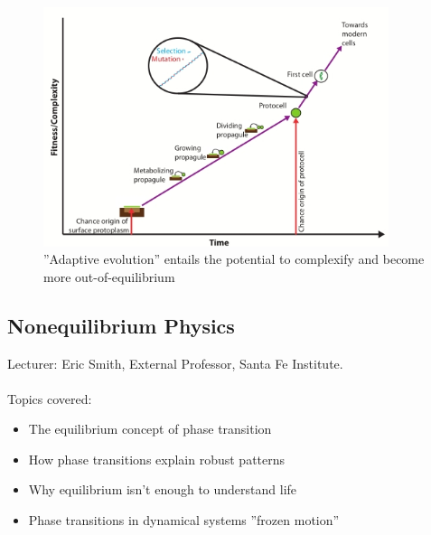 \documentclass[]{article}
\begin{document}
\begin{figure}[H]
	\caption{''Adaptive evolution'' entails the potential to complexify and become more out-of-equilibrium}\label{fig:AdaptiveEvolution} 
	\includegraphics[width=0.9\textwidth]{AdaptiveEvolution}
\end{figure}

\subsection{Nonequilibrium Physics}

Lecturer: Eric Smith, External Professor, Santa Fe Institute.\\
\\
Topics covered:
\begin{itemize}
	\item The equilibrium concept of phase transition
	
	\item How phase transitions explain robust patterns
	
	\item Why equilibrium isn’t enough to understand life
	\item Phase transitions in dynamical systems ''frozen motion''
\end{itemize}
\end{document}
